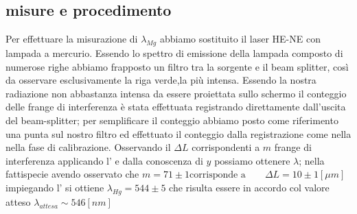\subsection{misure e procedimento}
Per effettuare la misurazione di $\lambda_{Mg}$
abbiamo sostituito il laser HE-NE con 
lampada a mercurio.
Essendo lo spettro di emissione della lampada 
composto di numerose righe
abbiamo frapposto un filtro tra la sorgente e il beam splitter,
così da osservare esclusivamente la riga verde,la più intensa.
Essendo la nostra radiazione non abbastanza intensa da essere 
proiettata sullo schermo il conteggio delle frange di interferenza
è stata effettuata registrando direttamente dall'uscita del beam-splitter; 
per semplificare il conteggio abbiamo 
posto come riferimento una punta sul nostro filtro ed effettuato il conteggio 
dalla registrazione come nella nella fase di calibrazione.
Osservando il $\Delta L$ corrispondenti a $m$ frange di
interferenza applicando l' e dalla conoscenza di $y$ 
possiamo ottenere $\lambda$;
nella fattispecie avendo osservato che \smallskip
 $m=71 \pm 1\text{corrisponde a}\qquad \Delta L =10\pm 1 [\mu m]$
 \smallskip
impiegando l' si ottiene $\lambda_{Hg}=544\pm 5$ che 
risulta essere in accordo col valore atteso 	
$\lambda_{attesa}\sim 546 [nm]$
